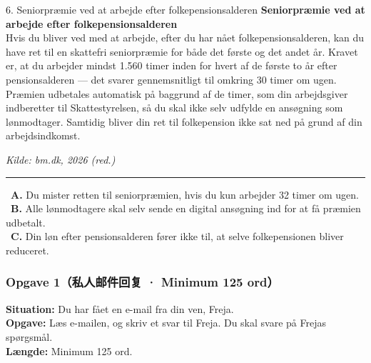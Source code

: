 \begin{emailbox}{6. Seniorpræmie ved at arbejde efter folkepensionsalderen}
\textbf{Seniorpræmie ved at arbejde efter folkepensionsalderen}\\
Hvis du bliver ved med at arbejde, efter du har nået folkepensionsalderen, kan du have ret til en skattefri seniorpræmie for både det første og det andet år. Kravet er, at du arbejder mindst 1.560 timer inden for hvert af de første to år efter pensionsalderen --- det svarer gennemsnitligt til omkring 30 timer om ugen. Præmien udbetales automatisk på baggrund af de timer, som din arbejdsgiver indberetter til Skattestyrelsen, så du skal ikke selv udfylde en ansøgning som lønmodtager. Samtidig bliver din ret til folkepension ikke sat ned på grund af din arbejdsindkomst.
\par\vspace{0.15em}\strut\hfill {\small\textit{Kilde: bm.dk, 2026 (red.)}}

\vspace{0.3em}
\hrule
\vspace{0.3em}
\small
\fbox{\phantom{X}}\ \textbf{A.} Du mister retten til seniorpræmien, hvis du kun arbejder 32 timer om ugen.\\[0.25em]
\fbox{\phantom{X}}\ \textbf{B.} Alle lønmodtagere skal selv sende en digital ansøgning ind for at få præmien udbetalt.\\[0.25em]
\fbox{\phantom{X}}\ \textbf{C.} Din løn efter pensionsalderen fører ikke til, at selve folkepensionen bliver reduceret.
\end{emailbox}


\subsubsection*{Opgave 1（私人邮件回复 · Minimum 125 ord）}

\textbf{Situation:} Du har fået en e-mail fra din ven, Freja.\\
\textbf{Opgave:} Læs e-mailen, og skriv et svar til Freja. Du skal svare på Frejas spørgsmål.\\
\textbf{Længde:} Minimum 125 ord.


